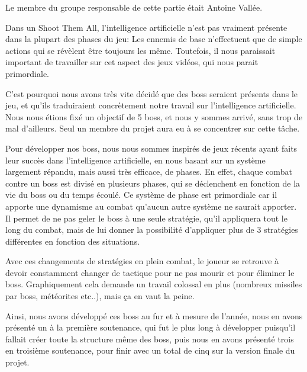 \par Le membre du groupe responsable de cette partie était Antoine Vallée.

\par Dans un Shoot Them All, l'intelligence artificielle n'est pas vraiment présente dans la plupart des phases du jeu: Les ennemis de base n'effectuent que de simple actions qui se révèlent être toujours les même. Toutefois, il nous paraissait important de travailler sur cet aspect des jeux vidéos, qui nous parait primordiale.
\par C'est pourquoi nous avons très vite décidé que des boss seraient présents dans le jeu, et qu'ils traduiraient concrètement notre travail sur l'intelligence artificielle. Nous nous étions fixé un objectif de 5 boss, et nous y sommes arrivé, sans trop de mal d'ailleurs. Seul un membre du projet aura eu à se concentrer sur cette tâche.
\par Pour développer nos boss, nous nous sommes inspirés de jeux récents ayant faits leur succès dans l'intelligence artificielle, en nous basant sur un système largement répandu, mais aussi très efficace, de phases. En effet, chaque combat contre un boss est divisé en plusieurs phases, qui se déclenchent en fonction de la vie du boss ou du temps écoulé. Ce système de phase est primordiale car il apporte une dynamisme au combat qu'aucun autre système ne saurait apporter. Il permet de ne pas geler le boss à une seule stratégie, qu'il appliquera tout le long du combat, mais de lui donner la possibilité d'appliquer plus de 3 stratégies différentes en fonction des situations.
\par Avec ces changements de stratégies en plein combat, le joueur se retrouve à devoir constamment changer de tactique pour ne pas mourir et pour éliminer le boss. Graphiquement cela demande un travail colossal en plus (nombreux missiles par boss, météorites etc..), mais ça en vaut la peine.
\par Ainsi, nous avons développé ces boss au fur et à mesure de l'année, nous en avons présenté un à la première soutenance, qui fut le plus long à développer puisqu'il fallait créer toute la structure même des boss, puis nous en avons présenté trois en troisième soutenance, pour finir avec un total de cinq sur la version finale du projet.


